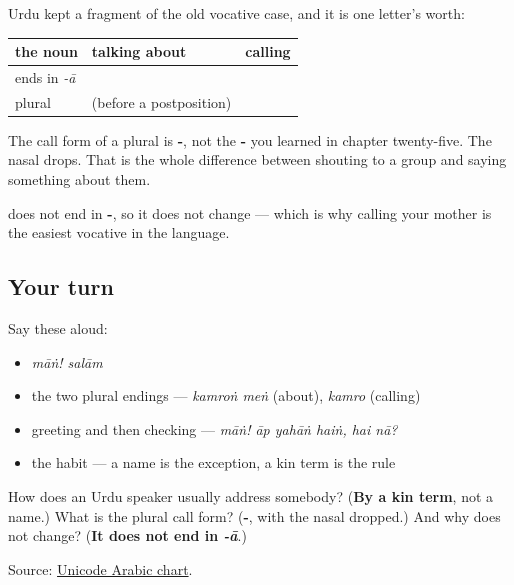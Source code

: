 \begin{grammarlens}[title={Grammar Lens: what the vocative does to the noun}]
Urdu kept a fragment of the old vocative case, and it is one letter's worth:

\noindent
\begin{tabularx}{\linewidth}{@{}>{\raggedright\arraybackslash}X>{\raggedright\arraybackslash}X>{\raggedright\arraybackslash}X@{}}
\toprule
\textbf{the noun} & \textbf{talking about} & \textbf{calling} \\
\midrule
ends in \emph{-ā} & \textbf{\ur{کمرہ}} & \textbf{\ur{کمرے}} \\
plural & \textbf{\ur{کمروں}} (before a postposition) & \textbf{\ur{کمرو}} \\
\bottomrule
\end{tabularx}

The call form of a plural is \textbf{-}, not the \textbf{-} you learned in chapter twenty-five. The nasal drops. That is the whole difference between shouting to a group and saying something about them.

\textbf{} does not end in \textbf{-}, so it does not change — which is why calling your mother is the easiest vocative in the language.
\end{grammarlens}

\subsection*{Your turn}
Say these aloud:

\begin{itemize}
\raggedright
  \item \emph{māṅ! salām}
  \item the two plural endings — \emph{kamroṅ meṅ} (about), \emph{kamro} (calling)
  \item greeting and then checking — \emph{māṅ! āp yahāṅ haiṅ, hai nā?}
  \item the habit — a name is the exception, a kin term is the rule
\end{itemize}

\begin{tcolorbox}[breakable,colback=teal!4,colframe=teal!35!black,title={Before you move on}]
How does an Urdu speaker usually address somebody? (\textbf{By a kin term}, not a name.) What is the plural call form? (\textbf{-}, with the nasal dropped.) And why does \textbf{} not change? (\textbf{It does not end in \emph{-ā}}.)

Source: \href{https://www.unicode.org/charts/PDF/U0600.pdf}{Unicode Arabic chart}.
\end{tcolorbox}
